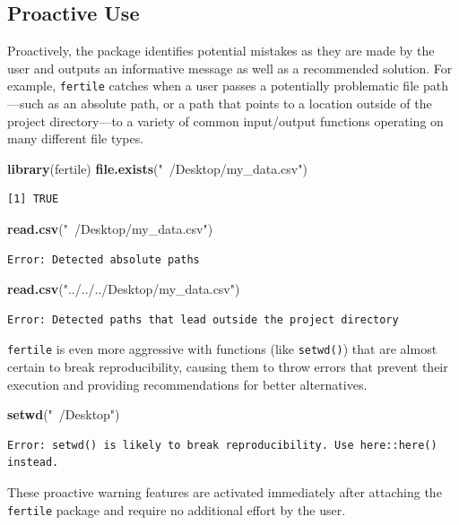 \documentclass[12pt,twoside]{reedthesis}
\newenvironment{Shaded}{\begin{snugshade}}{\end{snugshade}}
\newcommand{\KeywordTok}[1]{\textcolor[rgb]{0.13,0.29,0.53}{\textbf{#1}}}
\newcommand{\StringTok}[1]{\textcolor[rgb]{0.31,0.60,0.02}{#1}}
\newcommand{\NormalTok}[1]{#1}
\begin{document}
\subsection{Proactive Use}\label{proactive-use}

Proactively, the package identifies potential mistakes as they are made
by the user and outputs an informative message as well as a recommended
solution. For example, \texttt{fertile} catches when a user passes a
potentially problematic file path---such as an absolute path, or a path
that points to a location outside of the project directory---to a
variety of common input/output functions operating on many different
file types.
\begin{Shaded}
\begin{Highlighting}[]
\KeywordTok{library}\NormalTok{(fertile)}
\KeywordTok{file.exists}\NormalTok{(}\StringTok{"~/Desktop/my_data.csv"}\NormalTok{)}
\end{Highlighting}
\end{Shaded}
\begin{verbatim}
[1] TRUE
\end{verbatim}
\begin{Shaded}
\begin{Highlighting}[]
\KeywordTok{read.csv}\NormalTok{(}\StringTok{"~/Desktop/my_data.csv"}\NormalTok{)}
\end{Highlighting}
\end{Shaded}
\begin{verbatim}
Error: Detected absolute paths
\end{verbatim}
\begin{Shaded}
\begin{Highlighting}[]
\KeywordTok{read.csv}\NormalTok{(}\StringTok{"../../../Desktop/my_data.csv"}\NormalTok{)}
\end{Highlighting}
\end{Shaded}
\begin{verbatim}
Error: Detected paths that lead outside the project directory
\end{verbatim}
\texttt{fertile} is even more aggressive with functions (like
\texttt{setwd()}) that are almost certain to break reproducibility,
causing them to throw errors that prevent their execution and providing
recommendations for better alternatives.
\begin{Shaded}
\begin{Highlighting}[]
\KeywordTok{setwd}\NormalTok{(}\StringTok{"~/Desktop"}\NormalTok{)}
\end{Highlighting}
\end{Shaded}
\begin{verbatim}
Error: setwd() is likely to break reproducibility. Use here::here() instead.
\end{verbatim}
These proactive warning features are activated immediately after
attaching the \texttt{fertile} package and require no additional effort
by the user.
\end{document}
